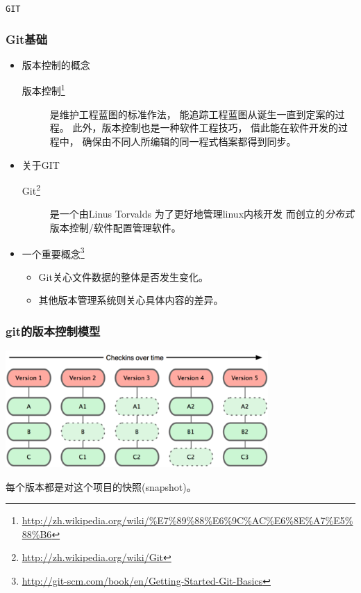 
\begin{frame}
    \begin{center}
        \LARGE \tt{GIT}
    \end{center}
\end{frame}

\begin{frame}
    \frametitle{Git基础}
    \begin{itemize}    
        \item 版本控制的概念
            \begin{description}
                \item[版本控制\footnote{\url{http://zh.wikipedia.org/wiki/\%E7\%89\%88\%E6\%9C\%AC\%E6\%8E\%A7\%E5\%88\%B6}}] 
                    是维护工程蓝图的标准作法，
                    能追踪工程蓝图从诞生一直到定案的过程。
                    此外，版本控制也是一种软件工程技巧，
                    借此能在软件开发的过程中，
                    确保由不同人所编辑的同一程式档案都得到同步。
            \end{description}
        \item 关于GIT
            \begin{description}
                \item[Git\footnote{\url{http://zh.wikipedia.org/wiki/Git}}] 
                    是一个由Linus Torvalds
                    为了更好地管理linux内核开发
                    而创立的{\em 分布式}版本控制/软件配置管理软件。
            \end{description}
        \item 一个重要概念\footnote{\url{http://git-scm.com/book/en/Getting-Started-Git-Basics}}
            \begin{itemize}
                \item Git关心文件数据的整体是否发生变化。
                \item 其他版本管理系统则关心具体内容的差异。
            \end{itemize}
    \end{itemize}
\end{frame}

\begin{frame}
    \frametitle{git的版本控制模型}
    \includegraphics[width=10cm,keepaspectratio]{data/GitRevisionModel.png}

    每个版本都是对这个项目的快照(snapshot)。
\end{frame}

